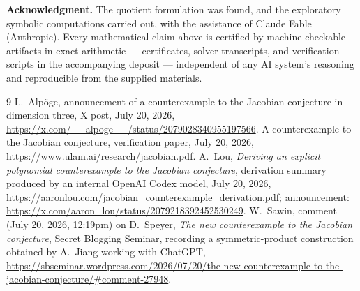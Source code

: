 \documentclass[11pt]{article}
\begin{document}
\medskip
\noindent\textbf{Acknowledgment.} The quotient formulation was found, and
the exploratory symbolic computations carried out, with the assistance of
Claude Fable (Anthropic). Every mathematical claim above is certified by
machine-checkable artifacts in exact arithmetic --- certificates, solver
transcripts, and verification scripts in the accompanying deposit ---
independent of any AI system's reasoning and reproducible from the supplied
materials.

\begin{thebibliography}{9}
 L.~Alp\"oge, announcement of a counterexample to the
Jacobian conjecture in dimension three, X post, July 20, 2026,
\url{https://x.com/__alpoge__/status/2079028340955197566}.
 A counterexample to the Jacobian conjecture, verification
paper, July 20, 2026, \url{https://www.ulam.ai/research/jacobian.pdf}.
 A.~Lou, \emph{Deriving an explicit polynomial
counterexample to the Jacobian conjecture}, derivation summary produced by an
internal OpenAI Codex model, July 20, 2026,
\url{https://aaronlou.com/jacobian_counterexample_derivation.pdf};
announcement: \url{https://x.com/aaron_lou/status/2079218392452530249}.
 W.~Sawin, comment (July 20, 2026, 12:19pm) on D.~Speyer,
\emph{The new counterexample to the Jacobian conjecture}, Secret Blogging
Seminar, recording a symmetric-product construction obtained by A.~Jiang
working with ChatGPT,
\url{https://sbseminar.wordpress.com/2026/07/20/the-new-counterexample-to-the-jacobian-conjecture/\#comment-27948}.
\end{thebibliography}
\end{document}
